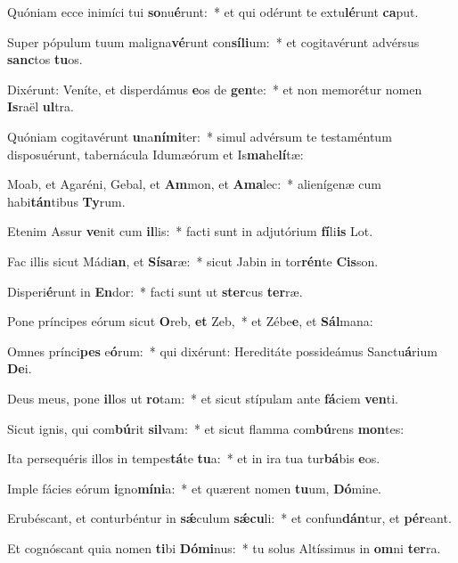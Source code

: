 \item Quóniam ecce inimíci tui \textbf{so}nu\textbf{é}runt:~* et qui odérunt te extu\textbf{lé}runt \textbf{ca}put.
\item Super pópulum tuum maligna\textbf{vé}runt con\textbf{sí}\textbf{li}um:~* et cogitavérunt advérsus \textbf{sanc}tos \textbf{tu}os.
\item Dixérunt: Veníte, et disperdámus \textbf{e}os de \textbf{gen}te:~* et non memorétur nomen \textbf{Is}raël \textbf{ul}tra.
\item Quóniam cogitavérunt \textbf{u}na\textbf{ní}\textbf{mi}ter:~* simul advérsum te testaméntum disposuérunt, tabernácula Idumæórum et Is\textbf{ma}he\textbf{lí}tæ:
\item Moab, et Agaréni, Gebal, et \textbf{Am}mon, et \textbf{A}\textbf{ma}lec:~* alienígenæ cum habi\textbf{tán}tibus \textbf{Ty}rum.
\item Etenim Assur \textbf{ve}nit cum \textbf{il}lis:~* facti sunt in adjutórium \textbf{fí}li\textbf{is} Lot.
\item Fac illis sicut Mádi\textbf{an}, et \textbf{Sí}\textbf{sa}ræ:~* sicut Jabin in tor\textbf{rén}te \textbf{Cis}son.
\item Disperi\textbf{é}runt in \textbf{En}dor:~* facti sunt ut \textbf{ster}cus \textbf{ter}ræ.
\item Pone príncipes eórum sicut \textbf{O}reb, \textbf{et} Zeb,~* et Zébe\textbf{e}, et \textbf{Sál}mana:
\item Omnes prínci\textbf{pes} e\textbf{ó}rum:~* qui dixérunt: Hereditáte possideámus Sanctu\textbf{á}rium \textbf{De}i.
\item Deus meus, pone \textbf{il}los ut \textbf{ro}tam:~* et sicut stípulam ante \textbf{fá}ciem \textbf{ven}ti.
\item Sicut ignis, qui com\textbf{bú}rit \textbf{sil}vam:~* et sicut flamma com\textbf{bú}rens \textbf{mon}tes:
\item Ita persequéris illos in tempes\textbf{tá}te \textbf{tu}a:~* et in ira tua tur\textbf{bá}bis \textbf{e}os.
\item Imple fácies eórum \textbf{i}gno\textbf{mí}\textbf{ni}a:~* et quærent nomen \textbf{tu}um, \textbf{Dó}mine.
\item Erubéscant, et conturbéntur in \textbf{sǽ}culum \textbf{sǽ}\textbf{cu}li:~* et confun\textbf{dán}tur, et \textbf{pér}eant.
\item Et cognóscant quia nomen \textbf{ti}bi \textbf{Dó}\textbf{mi}nus:~* tu solus Altíssimus in \textbf{om}ni \textbf{ter}ra.

